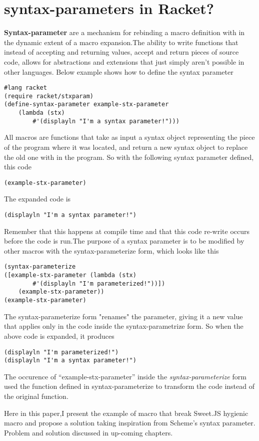 \section{syntax-parameters in Racket?}
\textbf{Syntax-parameter} are a mechanism for rebinding a macro definition with in the dynamic extent of a macro expansion.The ability to write functions that instead of accepting and returning values, accept and return pieces of source code, allows for abstractions and extensions that just simply aren't possible in other languages. Below example shows how to define the syntax parameter
\begin{lstlisting}[frame=single]
#lang racket
(require racket/stxparam)
(define-syntax-parameter example-stx-parameter
    (lambda (stx)
        #'(displayln "I'm a syntax parameter!")))
 \end{lstlisting}        
All macros are functions that take as input a syntax object representing the piece of the program where it was located, and return a new syntax object to replace the old one with in the program. So with the following syntax parameter defined, this code
\begin{lstlisting}[frame=single]
(example-stx-parameter)
\end{lstlisting} 
The expanded code is 
\begin{lstlisting}[frame=single]
(displayln "I'm a syntax parameter!")
\end{lstlisting} 
Remember that this happens at compile time and that this code re-write occurs before the code is run.The purpose of a syntax parameter is to be modified by other macros with the syntax-parameterize form, which looks like this
\begin{lstlisting}[frame=single]
(syntax-parameterize 
([example-stx-parameter (lambda (stx) 
		#'(displayln "I'm parameterized!"))])
    (example-stx-parameter))
(example-stx-parameter)
\end{lstlisting} 

The syntax-parameterize form "renames" the parameter, giving it a new value that applies only in the code inside the syntax-parametrize form. So when the above code is expanded, it produces

\begin{lstlisting}[frame=single]
(displayln "I'm parameterized!")
(displayln "I'm a syntax parameter!")
\end{lstlisting} 
The occurence of ``example-stx-parameter'' inside the \textit{syntax-parameterize} form used the function defined in syntax-parameterize to transform the code instead of the original function.

Here in this paper,I present the example of macro that break Sweet.JS hygienic macro and propose a solution taking inspiration from Scheme's syntax parameter. Problem and solution discussed in up-coming chapters.

